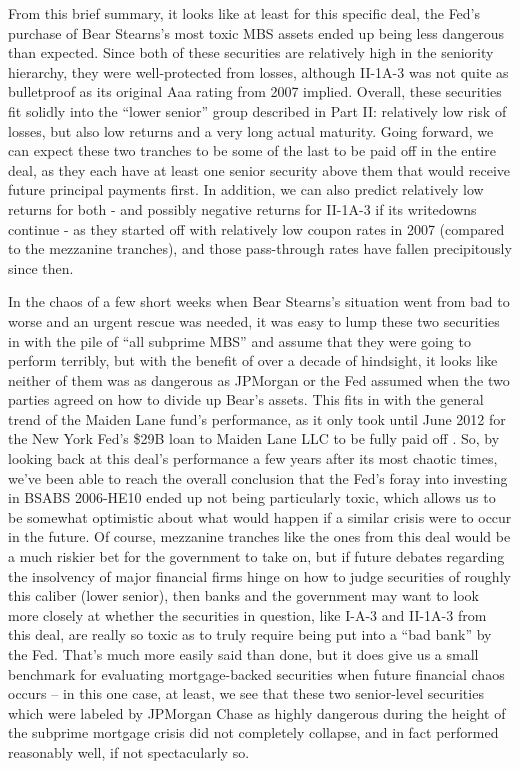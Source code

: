 \documentclass[12pt]{article}
\begin{document}
From this brief summary, it looks like at least for this specific deal, the Fed’s purchase of Bear Stearns’s most toxic MBS assets ended up being less dangerous than expected. Since both of these securities are relatively high in the seniority hierarchy, they were well-protected from losses, although II-1A-3 was not quite as bulletproof as its original Aaa rating from 2007 implied. Overall, these securities fit solidly into the “lower senior” group described in Part II: relatively low risk of losses, but also low returns and a very long actual maturity. Going forward, we can expect these two tranches to be some of the last to be paid off in the entire deal, as they each have at least one senior security above them that would receive future principal payments first. In addition, we can also predict relatively low returns for both - and possibly negative returns for II-1A-3 if its writedowns continue - as they started off with relatively low coupon rates in 2007 (compared to the mezzanine tranches), and those pass-through rates have fallen precipitously since then.

In the chaos of a few short weeks when Bear Stearns’s situation went from bad to worse and an urgent rescue was needed, it was easy to lump these two securities in with the pile of “all subprime MBS” and assume that they were going to perform terribly, but with the benefit of over a decade of hindsight, it looks like neither of them was as dangerous as JPMorgan or the Fed assumed when the two parties agreed on how to divide up Bear’s assets. This fits in with the general trend of the Maiden Lane fund’s performance, as it only took until June 2012 for the New York Fed’s \$29B loan to Maiden Lane LLC to be fully paid off \parencite{schaefer12}. So, by looking back at this deal’s performance a few years after its most chaotic times, we’ve been able to reach the overall conclusion that the Fed’s foray into investing in BSABS 2006-HE10 ended up not being particularly toxic, which allows us to be somewhat optimistic about what would happen if a similar crisis were to occur in the future. Of course, mezzanine tranches like the ones from this deal would be a much riskier bet for the government to take on, but if future debates regarding the insolvency of major financial firms hinge on how to judge securities of roughly this caliber (lower senior), then banks and the government may want to look more closely at whether the securities in question, like I-A-3 and II-1A-3 from this deal, are really so toxic as to truly require being put into a “bad bank” by the Fed. That’s much more easily said than done, but it does give us a small benchmark for evaluating mortgage-backed securities when future financial chaos occurs – in this one case, at least, we see that these two senior-level securities which were labeled by JPMorgan Chase as highly dangerous during the height of the subprime mortgage crisis did not completely collapse, and in fact performed reasonably well, if not spectacularly so.
\end{document}
